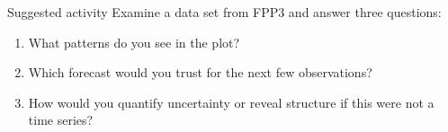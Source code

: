 \documentclass[aspectratio=169,11pt]{beamer}
\begin{document}
\begin{frame}{Suggested activity}
Examine a data set from FPP3 and answer three questions:

\vspace{0.3cm}
\begin{enumerate}
  \item What patterns do you see in the plot?
  \item Which forecast would you trust for the next few observations?
  \item How would you quantify uncertainty or reveal structure if this were not a time series?
\end{enumerate}

\end{frame}
\end{document}
